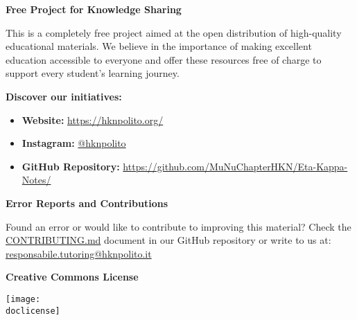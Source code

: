         \vspace{0.3cm}
        {\large\textbf{Free Project for Knowledge Sharing}}
        \par
        This is a completely free project aimed at the open distribution of high-quality educational materials. We believe in the importance of making excellent education accessible to everyone and offer these resources free of charge to support every student's learning journey.

        \vspace{0.3cm}
        {\large\textbf{Discover our initiatives:}}
        \par
        \begin{itemize}[topsep=0pt,itemsep=0pt,parsep=0pt,partopsep=0pt]
            \item \textbf{Website:} \href{https://hknpolito.org/}{https://hknpolito.org/}
            \item \textbf{Instagram:} \href{https://www.instagram.com/hknpolito/}{@hknpolito}
            \item \textbf{GitHub Repository:} \href{https://github.com/MuNuChapterHKN/Eta-Kappa-Notes/}{https://github.com/MuNuChapterHKN/Eta-Kappa-Notes/}
        \end{itemize}

        \vspace{0.3cm}
        \textbf{Error Reports and Contributions}
        \par
        Found an error or would like to contribute to improving this material? Check the \href{https://github.com/MuNuChapterHKN/Eta-Kappa-Notes/blob/main/CONTRIBUTING.md}{CONTRIBUTING.md} document in our GitHub repository or write to us at: \href{mailto:responsabile.tutoring@hknpolito.it}{responsabile.tutoring@hknpolito.it}

        \vfill

        \begin{center}
            \begin{minipage}{\linewidth}
                \begin{minipage}{0.6\textwidth}
                    {\Large\textbf{Creative Commons License}}
                \end{minipage}
                \begin{minipage}{0.39\linewidth}
                    \raggedleft
                    \texttt{[image: \\doclicense]}
                \end{minipage}
            \end{minipage}
        \end{center}

